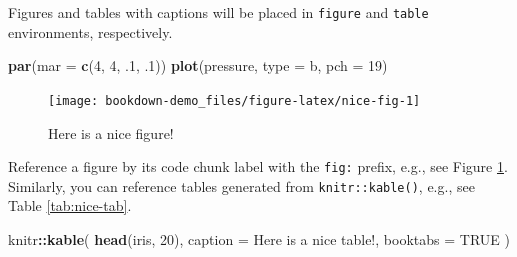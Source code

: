 \documentclass[
]{book}
\newenvironment{Shaded}{\begin{snugshade}}{\end{snugshade}}
\newcommand{\AttributeTok}[1]{\textcolor[rgb]{0.13,0.29,0.53}{#1}}
\newcommand{\ConstantTok}[1]{\textcolor[rgb]{0.56,0.35,0.01}{#1}}
\newcommand{\DecValTok}[1]{\textcolor[rgb]{0.00,0.00,0.81}{#1}}
\newcommand{\FunctionTok}[1]{\textcolor[rgb]{0.13,0.29,0.53}{\textbf{#1}}}
\newcommand{\NormalTok}[1]{#1}
\newcommand{\SpecialCharTok}[1]{\textcolor[rgb]{0.81,0.36,0.00}{\textbf{#1}}}
\newcommand{\StringTok}[1]{\textcolor[rgb]{0.31,0.60,0.02}{#1}}
\begin{document}
Figures and tables with captions will be placed in \texttt{figure} and \texttt{table} environments, respectively.

\begin{Shaded}
\begin{Highlighting}[]
\FunctionTok{par}\NormalTok{(}\AttributeTok{mar =} \FunctionTok{c}\NormalTok{(}\DecValTok{4}\NormalTok{, }\DecValTok{4}\NormalTok{, .}\DecValTok{1}\NormalTok{, .}\DecValTok{1}\NormalTok{))}
\FunctionTok{plot}\NormalTok{(pressure, }\AttributeTok{type =} \StringTok{\textquotesingle{}b\textquotesingle{}}\NormalTok{, }\AttributeTok{pch =} \DecValTok{19}\NormalTok{)}
\end{Highlighting}
\end{Shaded}

\begin{figure}

{\centering \texttt{[image: bookdown-demo\_files/figure-latex/nice-fig-1]} 

}

\caption{Here is a nice figure!}\label{fig:nice-fig}
\end{figure}

Reference a figure by its code chunk label with the \texttt{fig:} prefix, e.g., see Figure \ref{fig:nice-fig}. Similarly, you can reference tables generated from \texttt{knitr::kable()}, e.g., see Table \ref{tab:nice-tab}.

\begin{Shaded}
\begin{Highlighting}[]
\NormalTok{knitr}\SpecialCharTok{::}\FunctionTok{kable}\NormalTok{(}
  \FunctionTok{head}\NormalTok{(iris, }\DecValTok{20}\NormalTok{), }\AttributeTok{caption =} \StringTok{\textquotesingle{}Here is a nice table!\textquotesingle{}}\NormalTok{,}
  \AttributeTok{booktabs =} \ConstantTok{TRUE}
\NormalTok{)}
\end{Highlighting}
\end{Shaded}
\end{document}
